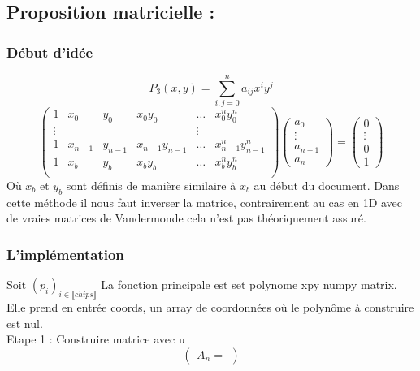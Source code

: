 \documentclass{article}
\begin{document}
\subsection{Proposition matricielle :}
\subsubsection*{Début d'idée}
\begin{equation*}
    P_3(x,y) = \sum_{i,j = 0}^{n} a_{ij}x^iy^j
\end{equation*}
\begin{equation*}
    \begin{pmatrix}
    1 & x_0 & y_0 & x_0y_0 & \dots & x_{0}^{n}y_{0}^{n} \\
    \vdots & & & & \vdots \\
    1 & x_{n-1} & y_{n-1} & x_{n-1}y_{n-1} & \dots & x_{n-1}^{n}y_{n-1}^{n} \\
    1 & x_{b} & y_{b} & x_{b}y_{b} & \dots & x_{b}^{n}y_{b}^{n} \\
    \end{pmatrix}
    \begin{pmatrix}
    a_0\\
    \vdots\\
    a_{n-1}\\
    a_{n}
    \end{pmatrix}
    =
    \begin{pmatrix}
    0\\
    \vdots\\
    0\\
    1
    \end{pmatrix}
\end{equation*}
Où $x_b$ et $y_b$ sont définis de manière similaire à $x_b$ au début du document. Dans cette méthode il nous faut inverser la matrice, contrairement au cas en 1D avec de vraies matrices de Vandermonde cela n'est pas théoriquement assuré.

\subsubsection*{L'implémentation}
Soit $(p_i)_{i \in \llbracket chips \rrbracket}$
La fonction principale est set polynome xpy numpy matrix.
Elle prend en entrée coords, un array de coordonnées où le polynôme à construire est nul.\\

Etape 1 : Construire matrice avec u
\begin{equation}
    \begin{pmatrix}
    A_{n} = 
\end{pmatrix}
\end{equation}
\end{document}
